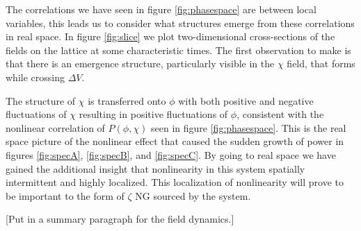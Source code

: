 

\Fphasespace

The correlations we have seen in figure \ref{fig:phasespace} are between local variables, this leads us to consider what structures emerge from these correlations in real space.
In figure \ref{fig:slice} we plot two-dimensional cross-sections of the fields on the lattice at some characteristic times.
The first observation to make is that there is an emergence structure, particularly visible in the $\chi$ field, that forms while crossing $\Delta V$.

The structure of $\chi$ is transferred onto $\phi$ with both positive and negative fluctuations of $\chi$ resulting in positive fluctuations of $\phi$, consistent with the nonlinear correlation of $P(\phi,\chi)$ seen in figure \ref{fig:phasespace}.
This is the real space picture of the nonlinear effect that caused the sudden growth of power in figures \ref{fig:specA}, \ref{fig:specB}, and \ref{fig:specC}.
By going to real space we have gained the additional insight that nonlinearity in this system spatially intermittent and highly localized.
This localization of nonlinearity will prove to be important to the form of $\zeta$ NG sourced by the system.


\Fslice
[Put in a summary paragraph for the field dynamics.]


